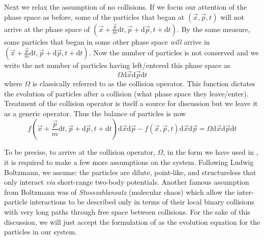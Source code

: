Next we relax the assumption of no collisions. If we focus our attention of the phase space as before, some of the particles that began at $(\vec{x},\vec{p},t)$ will not arrive at the phase space of $(\vec{x} + \frac{\vec{p}}{m}\mathrm{d}t,\vec{p} + \mathrm{d}\vec{p},t + \mathrm{d}t)$. By the same measure, some particles that began in some other phase space \textit{will} arrive in $(\vec{x} + \frac{\vec{p}}{m}\mathrm{d}t,\vec{p} + \mathrm{d}\vec{p},t + \mathrm{d}t)$. Now the number of particles is not conserved and we write the net number of particles having left/entered this phase space as
\begin{equation}
	\Omega\mathrm{d}\vec{x}\mathrm{d}\vec{p}\mathrm{d}t
\end{equation}
where $\Omega$ is classically referred to as the collision operator. This function dictates the evolution of particles after a collision (what phase space they leave/enter). Treatment of the collision operator is itself a source for discussion but we leave it as a generic operator. Thus the balance of particles is now
\begin{equation}\label{eq:particle-balance}
	f(\vec{x} + \frac{\vec{p}}{m}\mathrm{d}t,\vec{p} + \mathrm{d}\vec{p},t + \mathrm{d}t)\mathrm{d}\vec{x}\mathrm{d}\vec{p} - f(\vec{x},\vec{p},t)\mathrm{d}\vec{x}\mathrm{d}\vec{p} = \Omega\mathrm{d}\vec{x}\mathrm{d}\vec{p}\mathrm{d}t
\end{equation}

To be precise, to arrive at the collision operator, $\Omega$, in the form we have used in , it is required to make a few more assumptions on the system. Following Ludwig Boltzmann, we assume: the particles are dilute, point-like, and structureless that only interact \textit{via} short-range two-body potentials. Another famous assumption from Boltzmann was of \textit{Stosszahlansatz} (molecular chaos) which allow the inter-particle interactions to be described only in terms of their local binary collisions with very long paths through free space between collisions.\cite{succi2001lattice} For the sake of this discussion, we will just accept the formulation of  as the evolution equation for the particles in our system. 


